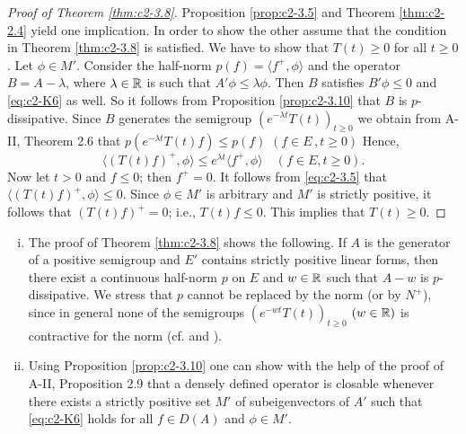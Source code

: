 \begin{proof}[Proof of Theorem \ref{thm:c2-3.8}]
Proposition \ref{prop:c2-3.5} and Theorem \ref{thm:c2-2.4}   yield one implication. 
In order to show the other assume that the condition in
Theorem \ref{thm:c2-3.8}   is satisfied. 
We have to show that $T(t) \geq 0$ for all $t \geq 0$.
Let $\phi \in M'$. 
Consider the half-norm $p(f) = \langle f^{+},\phi \rangle$ and the operator $B = A - \lambda$, where $\lambda \in \mathbb{R}$ is such that $A'\phi \leq \lambda\phi$. 
Then $B$ satisfies $B'\phi \leq 0$ and \ref{eq:c2-K6}   as well. 
So it follows from Proposition \ref{prop:c2-3.10}   that $B$ is $p$-dissipative.
Since $B$ generates the semigroup $(e^{-\lambda t}T(t))_{t \geq 0}$ we obtain from
A-II, Theorem 2.6 that $p(e^{-\lambda t}T(t)f) \leq p(f)$ $(f \in E\, , t\geq 0)$  
Hence,
\begin{equation} \label{eq:c2-3.5}
\langle (T(t)f)^{+}, \phi \rangle \leq e^{\lambda t} \langle f^{+}, \phi \rangle \quad (f \in E, t \geq 0).
\end{equation}
Now let $t > 0$ and $f \leq 0$; then $f^{+} = 0$. 
It follows from \eqref{eq:c2-3.5} that $\langle (T(t)f)^{+},\phi \rangle \leq 0$.
Since $\phi \in M'$ is arbitrary and $M'$ is strictly positive, it follows that $(T(t)f)^{+} = 0$; i.e., $T(t)f \leq 0$. 
This implies that $T(t) \geq 0$.
\end{proof}

\begin{remark}\label{rem:c2-3.11}
\begin{enumerate}[(i), wide, labelsep=1em, itemindent=\parindent]
\item \label{rem:c2-3.11-1}
The proof of Theorem \ref{thm:c2-3.8}   shows the following. 
If $A$ is the generator of a positive semigroup and $E'$ contains strictly
positive linear forms, then there exist a continuous half-norm $p$ on
$E$ and $w \in \mathbb{R}$ such that $A - w$ is $p$-dissipative. 
We stress that $p$ cannot be replaced by the norm (or by $N^{+}$), since in general none of the semigroups $(e^{-wt}T(t))_{t \geq 0}$ $(w \in \mathbb{R})$ is contractive for the norm (cf. \citet{derndinger:1984} and \citet{battydavies:1982}).
\item  \label{rem:c2-3.11-2}
Using Proposition \ref{prop:c2-3.10}   one can show with the help of the proof of 
A-II,  Proposition 2.9 that a densely defined operator is closable whenever
there exists a strictly positive set $M'$ of subeigenvectors of $A'$
such that \eqref{eq:c2-K6}   holds for all $f \in D(A)$ and $\phi \in M'$.
\end{enumerate}
\end{remark}

